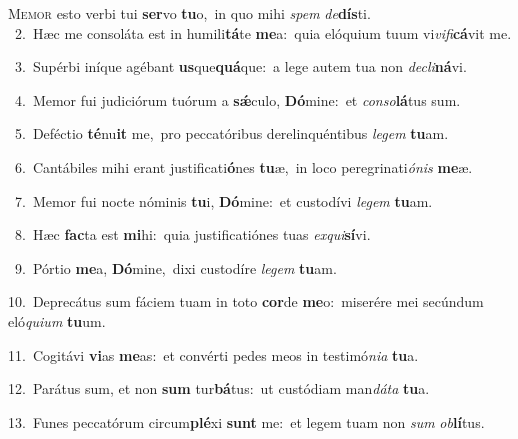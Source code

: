\lettrine{\initial\textcolor{\initialcolor}{M}}{emor} esto verbi tui \textbf{ser}\-vo \textbf{tu}\-o,~\star in quo mihi \textit{spem} \textit{de}\-\textbf{dís}ti.\\
{\numbfont\textcolor{\numbcolor}{~2.}}~Hæc me consoláta est in humili\-\textbf{tá}\-te \textbf{me}\-a:~\star quia elóquium tuum vi\-\textit{vi}\-\textit{fi}\textbf{cá}vit me.\par
{\numbfont\textcolor{\numbcolor}{~3.}}~Supérbi iníque agébant \textbf{us}\-que\-\textbf{quá}\-que:~\star a lege autem tua non \textit{de}\-\textit{cli}\textbf{ná}vi.\par
{\numbfont\textcolor{\numbcolor}{~4.}}~Memor fui judiciórum tuórum a \textbf{sǽ}\-culo, \textbf{Dó}\-mine:~\star et \textit{con}\-\textit{so}\textbf{lá}tus sum.\par
{\numbfont\textcolor{\numbcolor}{~5.}}~Deféctio \textbf{té}\-nu\textbf{it} me,~\star pro peccatóribus derelinquéntibus \textit{le}\-\textit{gem} \textbf{tu}\-am.\par
{\numbfont\textcolor{\numbcolor}{~6.}}~Cantábiles mihi erant justificati\-\textbf{ó}\-nes \textbf{tu}\-æ,~\star in loco peregrinati\-\textit{ó}\-\textit{nis} \textbf{me}\-æ.\par
{\numbfont\textcolor{\numbcolor}{~7.}}~Memor fui nocte nóminis \textbf{tu}\-i, \textbf{Dó}\-mine:~\star et custodívi \textit{le}\-\textit{gem} \textbf{tu}\-am.\par
{\numbfont\textcolor{\numbcolor}{~8.}}~Hæc \textbf{fac}\-ta est \textbf{mi}\-hi:~\star quia justificatiónes tuas \textit{ex}\-\textit{qui}\textbf{sí}vi.\par
{\numbfont\textcolor{\numbcolor}{~9.}}~Pórtio \textbf{me}\-a, \textbf{Dó}\-mine,~\star dixi custodíre \textit{le}\-\textit{gem} \textbf{tu}\-am.\par
{\numbfont\textcolor{\numbcolor}{10.}}~Deprecátus sum fáciem tuam in toto \textbf{cor}\-de \textbf{me}\-o:~\star miserére mei secúndum eló\-\textit{qui}\-\textit{um} \textbf{tu}\-um.\par
{\numbfont\textcolor{\numbcolor}{11.}}~Cogitávi \textbf{vi}\-as \textbf{me}\-as:~\star et convérti pedes meos in testimó\-\textit{ni}\-\textit{a} \textbf{tu}\-a.\par
{\numbfont\textcolor{\numbcolor}{12.}}~Parátus sum, et non \textbf{sum} tur\-\textbf{bá}\-tus:~\star ut custódiam man\-\textit{dá}\-\textit{ta} \textbf{tu}\-a.\par
{\numbfont\textcolor{\numbcolor}{13.}}~Funes peccatórum circum\-\textbf{plé}\-xi \textbf{sunt} me:~\star et legem tuam non \textit{sum} \textit{ob}\-\textbf{lí}tus.\par
